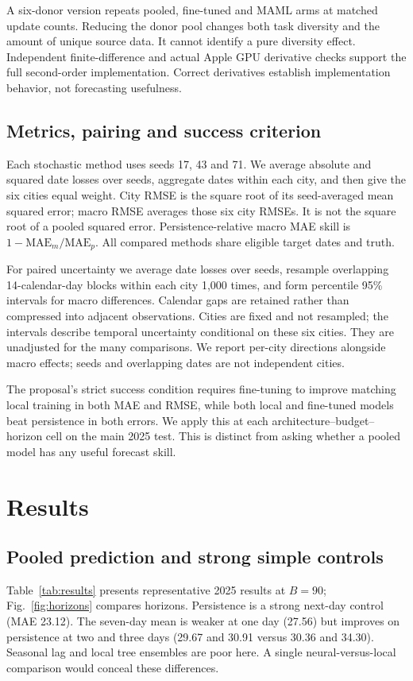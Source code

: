 \documentclass[conference]{IEEEtran}
\begin{document}
A six-donor version repeats pooled, fine-tuned and MAML arms at matched update counts. Reducing the donor pool changes both task diversity and the amount of unique source data. It cannot identify a pure diversity effect. Independent finite-difference and actual Apple GPU derivative checks support the full second-order implementation. Correct derivatives establish implementation behavior, not forecasting usefulness.

\subsection{Metrics, pairing and success criterion}
Each stochastic method uses seeds 17, 43 and 71. We average absolute and squared date losses over seeds, aggregate dates within each city, and then give the six cities equal weight. City RMSE is the square root of its seed-averaged mean squared error; macro RMSE averages those six city RMSEs. It is not the square root of a pooled squared error. Persistence-relative macro MAE skill is $1-\mathrm{MAE}_{m}/\mathrm{MAE}_{p}$. All compared methods share eligible target dates and truth.

For paired uncertainty we average date losses over seeds, resample overlapping 14-calendar-day blocks within each city 1,000 times, and form percentile 95\% intervals for macro differences. Calendar gaps are retained rather than compressed into adjacent observations. Cities are fixed and not resampled; the intervals describe temporal uncertainty conditional on these six cities. They are unadjusted for the many comparisons. We report per-city directions alongside macro effects; seeds and overlapping dates are not independent cities.

The proposal's strict success condition requires fine-tuning to improve matching local training in both MAE and RMSE, while both local and fine-tuned models beat persistence in both errors. We apply this at each architecture--budget--horizon cell on the main 2025 test. This is distinct from asking whether a pooled model has any useful forecast skill.

\section{Results}
\subsection{Pooled prediction and strong simple controls}
Table~\ref{tab:results} presents representative 2025 results at $B=90$; Fig.~\ref{fig:horizons} compares horizons. Persistence is a strong next-day control (MAE 23.12). The seven-day mean is weaker at one day (27.56) but improves on persistence at two and three days (29.67 and 30.91 versus 30.36 and 34.30). Seasonal lag and local tree ensembles are poor here. A single neural-versus-local comparison would conceal these differences.
\end{document}
